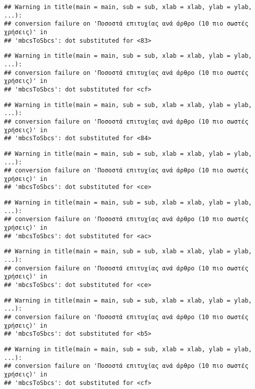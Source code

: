 \documentclass[
]{article}
\begin{document}
\begin{verbatim}
## Warning in title(main = main, sub = sub, xlab = xlab, ylab = ylab, ...):
## conversion failure on 'Ποσοστά επιτυχίας ανά άρθρο (10 πιο σωστές χρήσεις)' in
## 'mbcsToSbcs': dot substituted for <83>
\end{verbatim}

\begin{verbatim}
## Warning in title(main = main, sub = sub, xlab = xlab, ylab = ylab, ...):
## conversion failure on 'Ποσοστά επιτυχίας ανά άρθρο (10 πιο σωστές χρήσεις)' in
## 'mbcsToSbcs': dot substituted for <cf>
\end{verbatim}

\begin{verbatim}
## Warning in title(main = main, sub = sub, xlab = xlab, ylab = ylab, ...):
## conversion failure on 'Ποσοστά επιτυχίας ανά άρθρο (10 πιο σωστές χρήσεις)' in
## 'mbcsToSbcs': dot substituted for <84>
\end{verbatim}

\begin{verbatim}
## Warning in title(main = main, sub = sub, xlab = xlab, ylab = ylab, ...):
## conversion failure on 'Ποσοστά επιτυχίας ανά άρθρο (10 πιο σωστές χρήσεις)' in
## 'mbcsToSbcs': dot substituted for <ce>
\end{verbatim}

\begin{verbatim}
## Warning in title(main = main, sub = sub, xlab = xlab, ylab = ylab, ...):
## conversion failure on 'Ποσοστά επιτυχίας ανά άρθρο (10 πιο σωστές χρήσεις)' in
## 'mbcsToSbcs': dot substituted for <ac>
\end{verbatim}

\begin{verbatim}
## Warning in title(main = main, sub = sub, xlab = xlab, ylab = ylab, ...):
## conversion failure on 'Ποσοστά επιτυχίας ανά άρθρο (10 πιο σωστές χρήσεις)' in
## 'mbcsToSbcs': dot substituted for <ce>
\end{verbatim}

\begin{verbatim}
## Warning in title(main = main, sub = sub, xlab = xlab, ylab = ylab, ...):
## conversion failure on 'Ποσοστά επιτυχίας ανά άρθρο (10 πιο σωστές χρήσεις)' in
## 'mbcsToSbcs': dot substituted for <b5>
\end{verbatim}

\begin{verbatim}
## Warning in title(main = main, sub = sub, xlab = xlab, ylab = ylab, ...):
## conversion failure on 'Ποσοστά επιτυχίας ανά άρθρο (10 πιο σωστές χρήσεις)' in
## 'mbcsToSbcs': dot substituted for <cf>
\end{verbatim}
\end{document}
